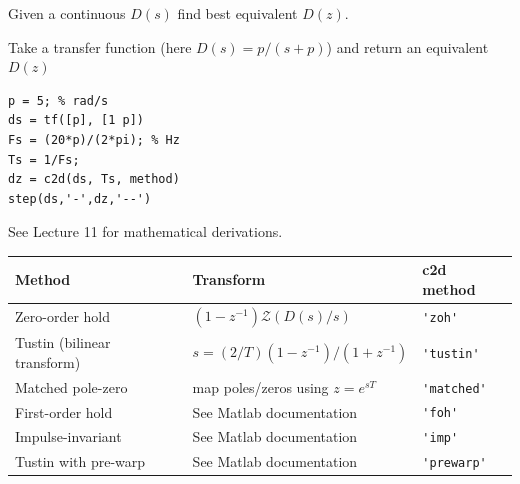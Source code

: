 \begin{slide}\label{slides:l12s6}
	Given a continuous $D(s)$ find best equivalent $D(z)$.
	\begin{center}
	\end{center}
\end{slide}

\begin{slide}
	Take a transfer function (here $D(s)=p/(s+p)$) and return an equivalent $D(z)$
\begin{verbatim}
p = 5; % rad/s
ds = tf([p], [1 p])
Fs = (20*p)/(2*pi); % Hz
Ts = 1/Fs;
dz = c2d(ds, Ts, method)
step(ds,'-',dz,'--')
\end{verbatim}
\end{slide}

\begin{slide}
	See Lecture 11 for mathematical derivations.
	\begin{center}
		\begin{tabular}{|l|l|l|}
			\hline
			\textbf{Method} & \textbf{Transform} & \textbf{c2d method} \\
			\hline
			Zero-order hold & $(1-z^{-1})\mathcal{Z}(D(s)/s)$ & \verb|'zoh'| \\
			\hline
			Tustin (bilinear transform) & $s = (2/T)(1-z^{-1})/(1+z^{-1})$ & \verb|'tustin'| \\
			\hline
			Matched pole-zero & map poles/zeros using $z=e^{sT}$ & \verb|'matched'| \\
			\hline
			First-order hold & See Matlab documentation & \verb|'foh'| \\
			\hline
			Impulse-invariant & See Matlab documentation & \verb|'imp'| \\
			\hline
			Tustin with pre-warp & See Matlab documentation & \verb|'prewarp'| \\
			\hline
		\end{tabular}
	\end{center}
\end{slide}

